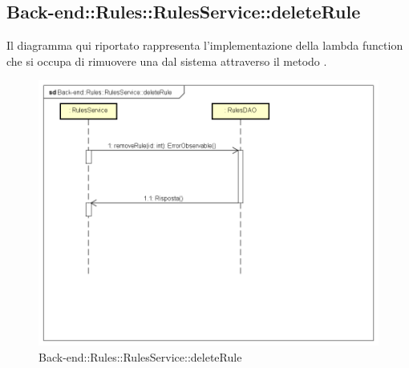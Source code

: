 \subsection{Back-end::Rules::RulesService::deleteRule}
Il diagramma qui riportato rappresenta l'implementazione della lambda function che si occupa di rimuovere una  dal sistema attraverso il metodo . 
\begin{figure}[h] \centering \includegraphics[width=\textwidth,height=\textheight,keepaspectratio]{images/diagrams/back-end/Ufficial_Backend/Back-endRulesRulesServicedeleteRule.png} 	\caption{Back-end::Rules::RulesService::deleteRule}
\end{figure}
\newpage

